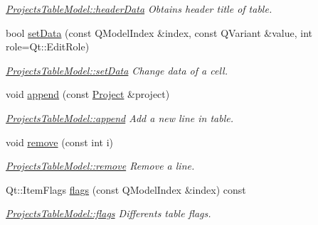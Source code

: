 \begin{DoxyCompactItemize}
\begin{DoxyCompactList}\small\item\em \hyperlink{classGui_1_1Widgets_1_1WdgModels_1_1ProjectsTableModel_ad984702eada2770507a1507ea9e3e685}{Projects\+Table\+Model\+::header\+Data} Obtains header title of table. \end{DoxyCompactList}\item 
bool \hyperlink{classGui_1_1Widgets_1_1WdgModels_1_1ProjectsTableModel_ae5072671b7fb73a4544a0cf913a38e53}{set\+Data} (const Q\+Model\+Index \&index, const Q\+Variant \&value, int role=Qt\+::\+Edit\+Role)
\begin{DoxyCompactList}\small\item\em \hyperlink{classGui_1_1Widgets_1_1WdgModels_1_1ProjectsTableModel_ae5072671b7fb73a4544a0cf913a38e53}{Projects\+Table\+Model\+::set\+Data} Change data of a cell. \end{DoxyCompactList}\item 
void \hyperlink{classGui_1_1Widgets_1_1WdgModels_1_1ProjectsTableModel_a9ef39bf8d33a49cc9c2ca6f77e41cd56}{append} (const \hyperlink{classModels_1_1Project}{Project} \&project)
\begin{DoxyCompactList}\small\item\em \hyperlink{classGui_1_1Widgets_1_1WdgModels_1_1ProjectsTableModel_a9ef39bf8d33a49cc9c2ca6f77e41cd56}{Projects\+Table\+Model\+::append} Add a new line in table. \end{DoxyCompactList}\item 
void \hyperlink{classGui_1_1Widgets_1_1WdgModels_1_1ProjectsTableModel_a696b8b328d2e354cb3155ab648ae5067}{remove} (const int i)
\begin{DoxyCompactList}\small\item\em \hyperlink{classGui_1_1Widgets_1_1WdgModels_1_1ProjectsTableModel_a696b8b328d2e354cb3155ab648ae5067}{Projects\+Table\+Model\+::remove} Remove a line. \end{DoxyCompactList}\item 
Qt\+::\+Item\+Flags \hyperlink{classGui_1_1Widgets_1_1WdgModels_1_1ProjectsTableModel_a94739f3784ae7ae93c85b5bebc6f9aa2}{flags} (const Q\+Model\+Index \&index) const 
\begin{DoxyCompactList}\small\item\em \hyperlink{classGui_1_1Widgets_1_1WdgModels_1_1ProjectsTableModel_a94739f3784ae7ae93c85b5bebc6f9aa2}{Projects\+Table\+Model\+::flags} Differents table flags. \end{DoxyCompactList}\item 

\end{DoxyCompactItemize}
